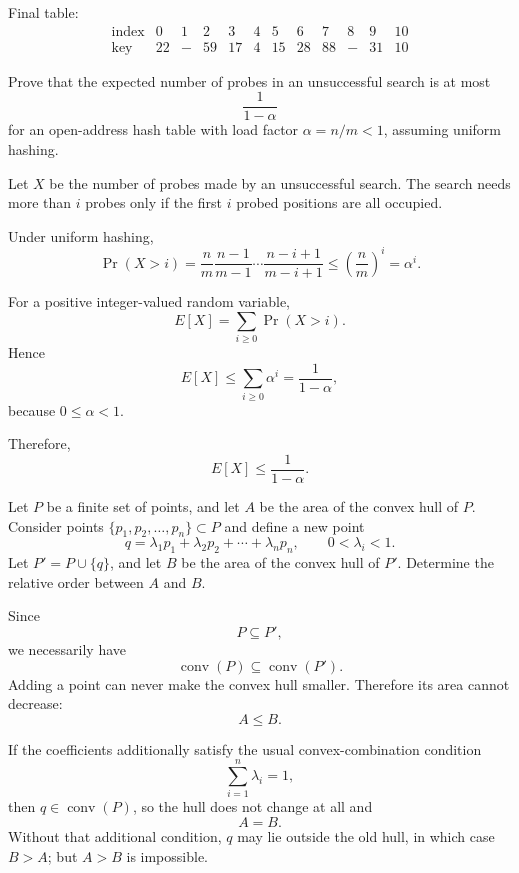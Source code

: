 \documentclass[11pt,a4paper]{article}
\begin{document}
\begin{qaanswer}[Answer 1(b)]
Final table:
\[
\begin{array}{c|ccccccccccc}
\text{index}&0&1&2&3&4&5&6&7&8&9&10\\ \hline
\text{key}&22&-&59&17&4&15&28&88&-&31&10
\end{array}
\]
\end{qaanswer}

\begin{qaquestion}
Prove that the expected number of probes in an unsuccessful search is at most
\[
\frac{1}{1-\alpha}
\]
for an open-address hash table with load factor \(\alpha=n/m<1\), assuming uniform hashing.
\end{qaquestion}

\begin{qaanswer}[Answer 1(c)]
Let \(X\) be the number of probes made by an unsuccessful search. The search needs more than \(i\) probes only if the first \(i\) probed positions are all occupied.

Under uniform hashing,
\[
\Pr(X>i)
=\frac{n}{m}\frac{n-1}{m-1}\cdots\frac{n-i+1}{m-i+1}
\le \left(\frac{n}{m}\right)^i
=\alpha^i.
\]

For a positive integer-valued random variable,
\[
E[X]=\sum_{i\ge0}\Pr(X>i).
\]
Hence
\[
E[X]\le\sum_{i\ge0}\alpha^i
=\frac{1}{1-\alpha},
\]
because \(0\le\alpha<1\).

Therefore,
\[
\boxed{E[X]\le\frac{1}{1-\alpha}}.
\]
\end{qaanswer}

\begin{qaquestion}
Let \(P\) be a finite set of points, and let \(A\) be the area of the convex hull of \(P\). Consider points \(\{p_1,p_2,\ldots,p_n\}\subset P\) and define a new point
\[
q=\lambda_1p_1+\lambda_2p_2+\cdots+\lambda_np_n,
\qquad 0<\lambda_i<1.
\]
Let \(P'=P\cup\{q\}\), and let \(B\) be the area of the convex hull of \(P'\). Determine the relative order between \(A\) and \(B\).
\end{qaquestion}

\begin{qaanswer}[Answer 2(a)]
Since
\[
P\subseteq P',
\]
we necessarily have
\[
\operatorname{conv}(P)\subseteq \operatorname{conv}(P').
\]
Adding a point can never make the convex hull smaller. Therefore its area cannot decrease:
\[
\boxed{A\le B}.
\]

If the coefficients additionally satisfy the usual convex-combination condition
\[
\sum_{i=1}^{n}\lambda_i=1,
\]
then \(q\in\operatorname{conv}(P)\), so the hull does not change at all and
\[
\boxed{A=B}.
\]
Without that additional condition, \(q\) may lie outside the old hull, in which case \(B>A\); but \(A>B\) is impossible.
\end{qaanswer}
\end{document}
